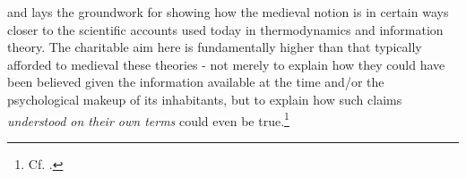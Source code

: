 \documentclass[]{article}
\begin{document}
and lays the groundwork for showing how the medieval notion is in certain ways closer to the scientific accounts used today in thermodynamics and information theory. 
The charitable aim here is fundamentally higher than that typically afforded to medieval these theories - 
not merely to explain how they could have been believed given the information available at the time and/or the psychological makeup of its inhabitants, 
but to explain how such claims \emph{understood on their own terms} could even be true.\footnote{Cf. \autocite{Rovelli2015}.} 




\end{document}
